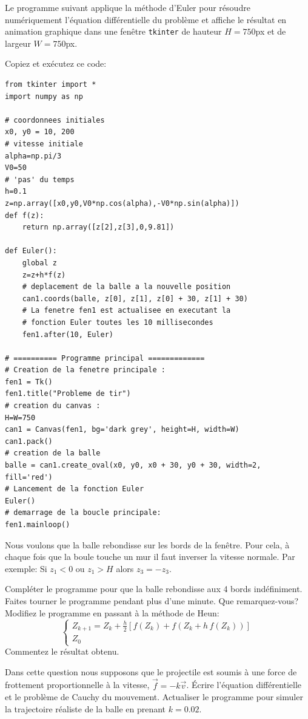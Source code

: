 \documentclass{article}
\begin{document}
  Le programme suivant applique la méthode d'Euler pour résoudre numériquement l'équation différentielle du problème et affiche le résultat en animation graphique dans une fenêtre {\tt tkinter} de hauteur $H=750$px et de largeur $W=750$px.
  
   Copiez et exécutez ce code:%
\begin{verbatim}
from tkinter import *
import numpy as np

# coordonnees initiales
x0, y0 = 10, 200
# vitesse initiale
alpha=np.pi/3
V0=50
# 'pas' du temps
h=0.1
z=np.array([x0,y0,V0*np.cos(alpha),-V0*np.sin(alpha)])
def f(z):
    return np.array([z[2],z[3],0,9.81])

def Euler():
    global z
    z=z+h*f(z)
    # deplacement de la balle a la nouvelle position
    can1.coords(balle, z[0], z[1], z[0] + 30, z[1] + 30)
    # La fenetre fen1 est actualisee en executant la
    # fonction Euler toutes les 10 millisecondes
    fen1.after(10, Euler)

# ========== Programme principal =============
# Creation de la fenetre principale :
fen1 = Tk()
fen1.title("Probleme de tir")
# creation du canvas :
H=W=750
can1 = Canvas(fen1, bg='dark grey', height=H, width=W)
can1.pack()
# creation de la balle
balle = can1.create_oval(x0, y0, x0 + 30, y0 + 30, width=2, fill='red')
# Lancement de la fonction Euler
Euler()
# demarrage de la boucle principale:
fen1.mainloop()

\end{verbatim} 
  
  Nous voulons que la balle rebondisse sur les bords de la fenêtre. Pour cela, à chaque fois que la boule touche un mur il faut inverser la vitesse normale. Par exemple: Si $z_1<0$ ou $z_1>H$ alors $z_3=-z_3$.

  Compléter le programme pour que la balle rebondisse aux 4 bords indéfiniment. 
  Faites tourner le programme pendant plus d'une minute. Que remarquez-vous?
  Modifiez le programme en passant à la méthode de Heun:
  \[\left\{\begin{array}{l}
  Z_{k+1}=Z_k+\frac h2\left[f(Z_k)+f(Z_k+h\,f(Z_k))\right]\\
  Z_0 
  \end{array}\right.\]
  Commentez le résultat obtenu.
  
  Dans cette question nous supposons que le projectile est soumis à une force de frottement proportionnelle à la vitesse, $\vec f=-k\vec v$. Écrire l'équation différentielle et le problème de Cauchy du mouvement. Actualiser le programme pour simuler la trajectoire réaliste de la balle en prenant $k=0.02$.
\end{document}
